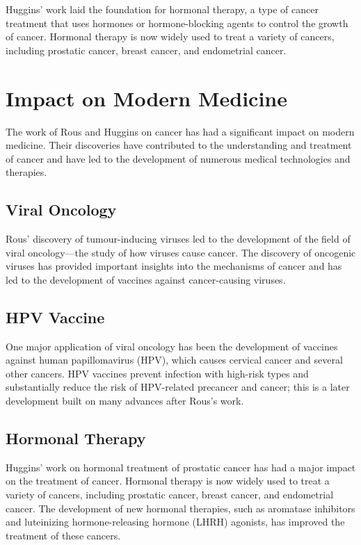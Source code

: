 Huggins' work laid the foundation for hormonal therapy, a type of cancer treatment that uses hormones or hormone-blocking agents to control the growth of cancer. Hormonal therapy is now widely used to treat a variety of cancers, including prostatic cancer, breast cancer, and endometrial cancer.

\section{Impact on Modern Medicine}

The work of Rous and Huggins on cancer has had a significant impact on modern medicine. Their discoveries have contributed to the understanding and treatment of cancer and have led to the development of numerous medical technologies and therapies.

\subsection{Viral Oncology}

Rous' discovery of tumour-inducing viruses led to the development of the field of viral oncology---the study of how viruses cause cancer. The discovery of oncogenic viruses has provided important insights into the mechanisms of cancer and has led to the development of vaccines against cancer-causing viruses.

\subsection{HPV Vaccine}

One major application of viral oncology has been the development of vaccines against human papillomavirus (HPV), which causes cervical cancer and several other cancers. HPV vaccines prevent infection with high-risk types and substantially reduce the risk of HPV-related precancer and cancer; this is a later development built on many advances after Rous's work.

\subsection{Hormonal Therapy}

Huggins' work on hormonal treatment of prostatic cancer has had a major impact on the treatment of cancer. Hormonal therapy is now widely used to treat a variety of cancers, including prostatic cancer, breast cancer, and endometrial cancer. The development of new hormonal therapies, such as aromatase inhibitors and luteinizing hormone-releasing hormone (LHRH) agonists, has improved the treatment of these cancers.

